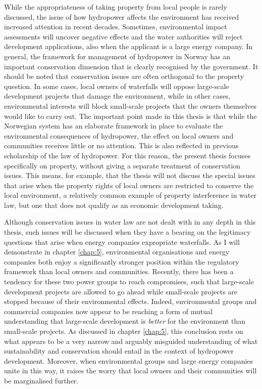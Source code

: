 While the appropriateness of taking property from local people is rarely discussed, the issue of how hydropower affects the environment has received increased attention in recent decades. Sometimes, environmental impact assessments will uncover negative effects and the water authorities will reject development applications, also when the applicant is a large energy company. In general, the framework for management of hydropower in Norway has an important conservation dimension that is clearly recognised by the government. It should be noted that conservation issues are often orthogonal to the property question. In some cases, local owners of waterfalls will oppose large-scale development projects that damage the environment, while in other cases, environmental interests will block small-scale projects that the owners themselves would like to carry out. The important point made in this thesis is that while the Norwegian system has an elaborate framework in place to evaluate the environmental consequences of hydropower, the effect on local owners and communities receives little or no attention. This is also reflected in previous scholarship of the law of hydropower. For this reason, the present thesis focuses specifically on property, without giving a separate treatment of conservation issues. This means, for example, that the thesis will not discuss the special issues that arise when the property rights of local owners are restricted to conserve the local environment, a relatively common example of property interference in water law, but one that does not qualify as an economic development taking. 

Although conservation issues in water law are not dealt with in any depth in this thesis, such issues will be discussed when they have a bearing on the legitimacy questions that arise when energy companies expropriate waterfalls. As I will demonstrate in chapter \ref{chap:5}, environmental organisations and energy companies both enjoy a significantly stronger position within the regulatory framework than local owners and communities. Recently, there has been a tendency for these two power groups to reach compromises, such that large-scale development projects are allowed to go ahead while small-scale projects are stopped because of their environmental effects. Indeed, environmental groups and commercial companies now appear to be reaching a form of mutual understanding that large-scale development is {\it better} for the environment than small-scale projects. As discussed in chapter \ref{chap:5}, this conclusion rests on what appears to be a very narrow and arguably misguided understanding of what sustainability and conservation should entail in the context of hydropower development. Moreover, when environmental groups and large energy companies unite in this way, it raises the worry that local owners and their communities will be marginalised further.

